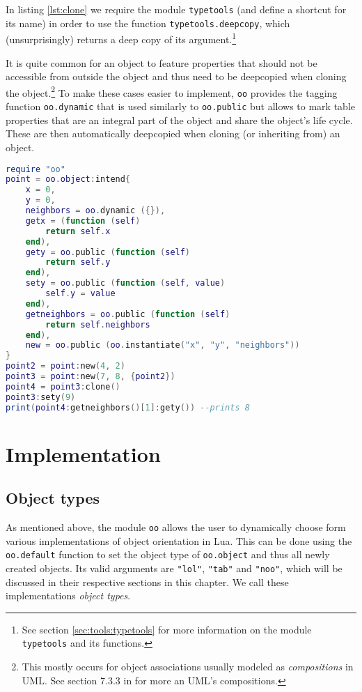 In listing \ref{lst:clone} we require the module \texttt{typetools} (and define a shortcut for its name) in order to use the function \texttt{typetools.deepcopy}, which (unsurprisingly) returns a deep copy of its argument.\footnote{See section \ref{sec:tools:typetools} for more information on the module \texttt{typetools} and its functions.}

It is quite common for an object to feature properties that should not be accessible from outside the object and thus need to be deepcopied when cloning the object.\footnote{This mostly occurs for object associations usually modeled as \emph{compositions} in UML. See section 7.3.3 in \cite{UML} for more an UML's compositions.} To make these cases easier to implement, \texttt{oo} provides the tagging function \texttt{oo.dynamic} that is used similarly to \texttt{oo.public} but allows to mark table properties that are an integral part of the object and share the object's life cycle. These are then automatically deepcopied when cloning (or inheriting from) an object.

\begin{lstlisting}[language=lua, caption={Rewriting listing \ref{lst:clone} using \texttt{oo.dynamic}}, label=lst:dynamic, name=lst:dynamic]
require "oo"
point = oo.object:intend{
	x = 0,
	y = 0,
	neighbors = oo.dynamic ({}),
	getx = (function (self)
		return self.x
	end),
	gety = oo.public (function (self)
		return self.y
	end),
	sety = oo.public (function (self, value)
		self.y = value
	end),
	getneighbors = oo.public (function (self)
		return self.neighbors
	end),
	new = oo.public (oo.instantiate("x", "y", "neighbors"))
}
point2 = point:new(4, 2)
point3 = point:new(7, 8, {point2})
point4 = point3:clone()
point3:sety(9)
print(point4:getneighbors()[1]:gety()) --prints 8
\end{lstlisting}


\section{Implementation}
\label{sec:oo:implementation}

\subsection{Object types}

As mentioned above, the module \texttt{oo} allows the user to dynamically choose form various implementations of object orientation in Lua. This can be done using the \texttt{oo.default} function to set the object type of \texttt{oo.object} and thus all newly created objects. Its valid arguments are \texttt{"lol"}, \texttt{"tab"} and \texttt{"noo"}, which will be discussed in their respective sections in this chapter. We call these implementations \emph{object types}.

